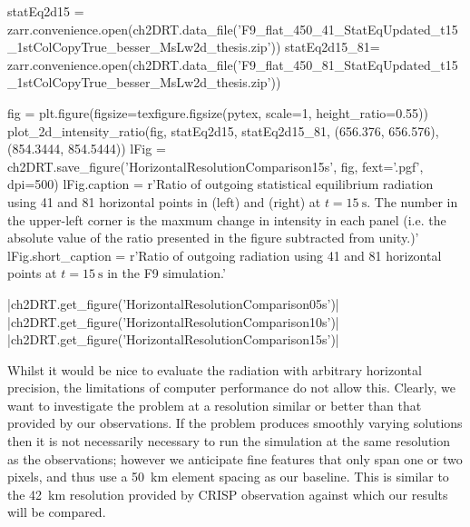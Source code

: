 \begin{pycode}[2DRT]
statEq2d15 = zarr.convenience.open(ch2DRT.data_file('F9_flat_450_41_StatEqUpdated_t15_1stColCopyTrue_besser_MsLw2d_thesis.zip'))
statEq2d15_81= zarr.convenience.open(ch2DRT.data_file('F9_flat_450_81_StatEqUpdated_t15_1stColCopyTrue_besser_MsLw2d_thesis.zip'))

fig = plt.figure(figsize=texfigure.figsize(pytex, scale=1, height_ratio=0.55))
plot_2d_intensity_ratio(fig, statEq2d15, statEq2d15_81, (656.376, 656.576), (854.3444, 854.5444))
lFig = ch2DRT.save_figure('HorizontalResolutionComparison15s', fig, fext='.pgf', dpi=500)
lFig.caption = r'Ratio of outgoing statistical equilibrium radiation using 41 and 81 horizontal points in \CaLine{} (left) and \Ha{} (right) at $t=\SI{15}{\second}$. The number in the upper-left corner is the maxmum change in intensity in each panel (i.e. the absolute value of the ratio presented in the figure subtracted from unity.)'
lFig.short_caption = r'Ratio of outgoing radiation using 41 and 81 horizontal points at $t=\SI{15}{\second}$ in the F9 simulation.'

\end{pycode}

\py[2DRT]|ch2DRT.get_figure('HorizontalResolutionComparison05s')|
\py[2DRT]|ch2DRT.get_figure('HorizontalResolutionComparison10s')|
\py[2DRT]|ch2DRT.get_figure('HorizontalResolutionComparison15s')|

Whilst it would be nice to evaluate the radiation with arbitrary horizontal precision, the limitations of computer performance do not allow this.
Clearly, we want to investigate the problem at a resolution similar or better than that provided by our observations.
If the problem produces smoothly varying solutions then it is not necessarily necessary to run the simulation at the same resolution as the observations; however we anticipate fine features that only span one or two pixels, and thus use a \SI{50}{\kilo\metre} element spacing as our baseline.
This is similar to the \SI{42}{\kilo\metre} resolution provided by CRISP observation against which our results will be compared.

